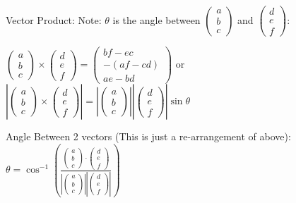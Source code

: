 \documentclass[10pt,a4paper,oneside]{book}
\begin{document}
Vector Product: Note: $\theta$ is the angle between $\begin{pmatrix}
    a\\b\\c
\end{pmatrix}$ and $\begin{pmatrix}
    d\\e\\f
\end{pmatrix}$:

$\begin{pmatrix}
    a\\b\\c
\end{pmatrix}\times \begin{pmatrix}
    d\\e\\f
\end{pmatrix}=\begin{pmatrix}
    bf-ec\\
    -(af-cd)\\
    ae-bd
\end{pmatrix}$ or 
$\left|
\begin{pmatrix}
    a\\b\\c
\end{pmatrix}\times \begin{pmatrix}
    d\\e\\f
\end{pmatrix}
\right|=\left|\begin{pmatrix}
    a\\b\\c
\end{pmatrix}\right| \left|\begin{pmatrix}
    d\\e\\f
\end{pmatrix}\right| \sin\theta$

Angle Between 2 vectors (This is just a re-arrangement of above): $\theta=\cos^{-1}\left(\frac{\begin{pmatrix} a\\b\\c\end{pmatrix}\cdot \begin{pmatrix}
d\\e\\f 
\end{pmatrix}}{\left|\begin{pmatrix}
a\\b\\c
\end{pmatrix}\right|\left|\begin{pmatrix}
    d\\e\\f
    \end{pmatrix}\right|}\right)$
\end{document}
